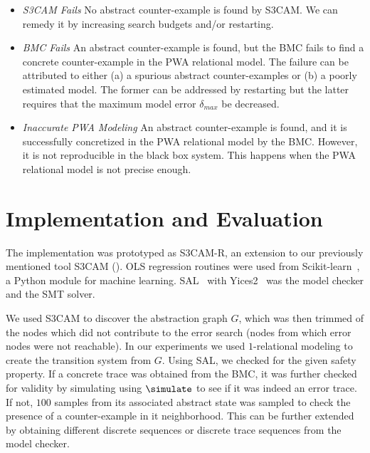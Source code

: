 \begin{itemize}

    \item \emph{S3CAM Fails} No abstract counter-example is found by
        S3CAM. We can remedy it by increasing search budgets and/or
        restarting.

    \item \emph{BMC Fails} An abstract counter-example is found, but
        the BMC fails to find a concrete counter-example in the PWA
        relational model. The failure can be attributed to either (a)
        a spurious abstract counter-examples or (b) a poorly estimated
        model. The former can be addressed by restarting but the
        latter requires that the maximum model error $\delta_{max}$ be
        decreased.

    \item \emph{Inaccurate PWA Modeling} An abstract counter-example
        is found, and it is successfully concretized in the PWA
        relational model by the BMC. However, it is not reproducible
        in the black box system. This happens when the PWA relational
        model is not precise enough.

\end{itemize}


\section{Implementation and Evaluation}

The implementation was prototyped as S3CAM-R, an extension to our
previously mentioned tool S3CAM (). OLS regression
routines were used from Scikit-learn~\cite{pedregosa2011scikit}, a
Python module for machine learning. SAL~\cite{SAL-SRI}
with Yices2~\cite{dutertre2014yices} was the model checker and the SMT
solver.

We used S3CAM to discover the abstraction graph $G$, which was then
trimmed of the nodes which did not contribute to the error search
(nodes from which error nodes were not reachable). In our experiments we
used $1$-relational modeling to create the transition system from $G$.
Using SAL, we checked for the given safety property. If a concrete
trace was obtained from the BMC, it was further checked for validity
by simulating using $\simulate$ to see if it was indeed an error
trace.  If not, $100$ samples from its associated abstract state was
sampled to check the presence of a counter-example in it
neighborhood. This can be further extended by obtaining different
discrete sequences or discrete trace sequences from the model checker.

